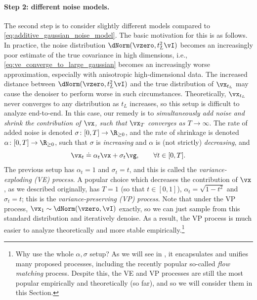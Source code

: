 \documentclass[../../book-main.tex]{subfiles}
\begin{document}
\paragraph{Step 2: different noise models.} The second step is to consider slightly different models compared to \eqref{eq:additive_gaussian_noise_model}. The basic motivation for this is as follows. In practice, the noise distribution \(\dNorm(\vzero, t_{L}^{2}\vI)\) becomes an increasingly poor estimate of the true covariance in high dimensions, i.e., \eqref{eq:ve_converge_to_large_gaussian} becomes an increasingly worse approximation, especially with anisotropic high-dimensional data. The increased distance between \(\dNorm(\vzero, t_{L}^{2}\vI)\) and the true distribution of \(\vx_{t_{L}}\) may cause the denoiser to perform worse in such circumstances. Theoretically, \(\vx_{t_{L}}\) never converges to any distribution as \(t_{L}\) increases, so this setup is difficult to analyze end-to-end. In this case, our remedy is to \textit{simultaneously add noise and shrink the contribution of \(\vx\), such that \(\vx_{T}\) converges as \(T \to \infty\)}. The rate of added noise is denoted \(\sigma \colon [0, T] \to \R_{\geq 0}\), and the rate of shrinkage is denoted \(\alpha \colon [0, T] \to \R_{\geq 0}\), such that \(\sigma\) is \textit{increasing} and \(\alpha\) is (not strictly) \textit{decreasing}, and 
\begin{equation}\label{eq:gen_additive_gaussian_noise_model}
	\vx_{t} \doteq \alpha_{t}\vx + \sigma_{t}\vg, \qquad \forall t \in [0, T].
\end{equation}
The previous setup has \(\alpha_{t} = 1\) and \(\sigma_{t} = t\), and this is called the \textit{variance-exploding (VE) process}. A popular choice which decreases the contribution of \(\vx\), as we described originally, has \(T = 1\) (so that \(t \in [0, 1]\)), \(\alpha_{t} = \sqrt{1 - t^{2}}\) and \(\sigma_{t} = t\); this is the \textit{variance-preserving (VP) process}. Note that under the VP process, \(\vx_{1} \sim \dNorm(\vzero, \vI)\) exactly, so we can just sample from this standard distribution and iteratively denoise. As a result, the VP process is much easier to analyze theoretically and more stable empirically.\footnote{Why use the whole \(\alpha, \sigma\) setup? As we will see in , it encapsulates and unifies many proposed processes, including the recently popular so-called \textit{flow matching} process. Despite this, the VE and VP processes are still the most popular empirically and theoretically (so far), and so we will consider them in this Section.} 
\end{document}
